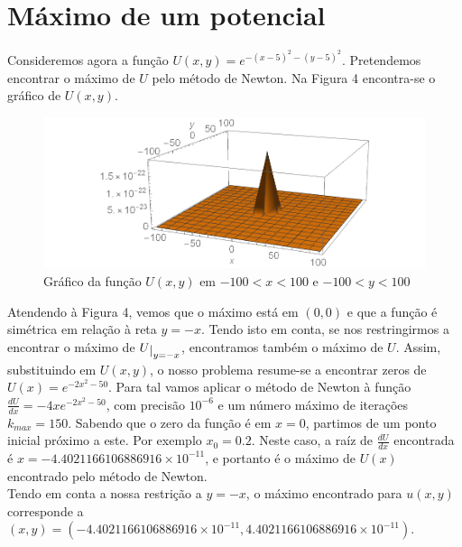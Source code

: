 \documentclass[aps,pre,twocolumn,showpacs,amsmath,amssymb]{revtex4-1}
\newcommand\restrict[1]{\raisebox{-.5ex}{$|$}_{#1}}
\begin{document}
\pagebreak
\section{Máximo de um potencial}
Consideremos agora a função $U(x,y)=e^{-(x-5)^2-(y-5)^2}.$
Pretendemos encontrar o máximo de $U$ pelo método de Newton.
Na Figura 4 encontra-se o gráfico de $U(x,y)$.
\begin{figure}[hbt!]
  \includegraphics[width=\columnwidth]{potencial3D.png}
  \caption{Gráfico da função $U(x,y)$ em $-100<x<100$ e $-100<y<100$}
  \label{graficosistema2}
\end{figure}
Atendendo à Figura 4, vemos que o máximo está em $(0,0)$ e que a função é simétrica em relação à reta $y=-x$. Tendo isto em conta,
se nos restringirmos a encontrar o máximo de $U\restrict{y=-x}$, encontramos também o máximo de $U$.
Assim, substituindo em $U(x,y)$, o nosso problema resume-se a encontrar zeros de $U(x)=e^{-2x^2-50}$.
Para tal vamos aplicar o método de Newton à função $\frac{dU}{dx}=-4xe^{-2x^2-50}$, com precisão $10^{-6}$ e um número máximo de iterações $k_{max}=150$. Sabendo que o zero da função é em $x=0$, partimos de um ponto inicial próximo a este. Por exemplo $x_0=0.2$. Neste caso, a raíz de $\frac{dU}{dx}$ encontrada é $x=-4.4021166106886916\times10^{-11}$, e portanto é o máximo de $U(x)$ encontrado pelo método de Newton.\\
Tendo em conta a nossa restrição a $y=-x$, o máximo encontrado para $u(x,y)$ corresponde a $(x,y)=(-4.4021166106886916\times10^{-11},4.4021166106886916\times10^{-11})$.
\end{document}
